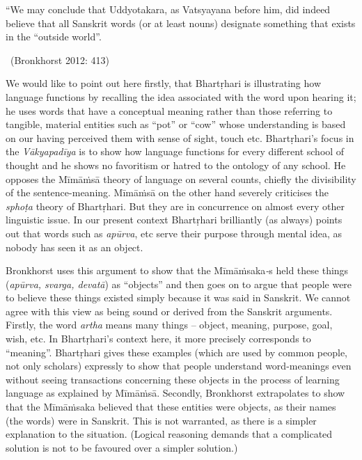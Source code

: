 \begin{myquote}
“We may conclude that Uddyotakara, as Vatsyayana before him, did indeed believe that all Sanskrit words (or at least nouns) designate something that exists in the “outside world”. 
\end{myquote}

\vspace{-.2cm}

\begin{myquote}

~\hfill (Bronkhorst 2012: 413)
\end{myquote}

We would like to point out here firstly, that Bhartṛhari is illustrating how language functions by recalling the idea associated with the word upon hearing it; he uses words that have a conceptual meaning rather than those referring to tangible, material entities such as “pot” or “cow” whose understanding is based on our having perceived them with sense of sight, touch etc. Bhartṛhari’s focus in the \textit{Vākyapadīya} is to show how language functions for every different school of thought and he shows no favoritism or hatred to the ontology of any school. He opposes the Mīmāṁsā theory of language on several counts, chiefly the divisibility of the sentence-meaning. Mīmāṁsā on the other hand severely criticises the \textit{sphoṭa} theory of Bhartṛhari. But they are in concurrence on almost every other linguistic issue. In our present context Bhartṛhari brilliantly (as always) points out that words such as \textit{apūrva}, etc serve their purpose through mental idea, as nobody has seen it as an object.

Bronkhorst uses this argument to show that the Mīmāṁsaka\textit{-}s held these things (\textit{apūrva, svarga, devatā}) as “objects” and then goes on to argue that people were to believe these things existed simply because it was said in Sanskrit. We cannot agree with this view as being sound or derived from the Sanskrit arguments. Firstly, the word \textit{artha} means many things -- object, meaning, purpose, goal, wish, etc. In Bhartṛhari’s context here, it more precisely corresponds to “meaning”. Bhartṛhari gives these examples (which are used by common people, not only scholars) expressly to show that people understand word-meanings even without seeing transactions concerning these objects in the process of learning language as explained by Mīmāṁsā. Secondly, Bronkhorst extrapolates to show that the Mīmāṁsaka believed that these entities were objects, as their names (the words) were in Sanskrit. This is not warranted, as there is a simpler explanation to the situation. (Logical reasoning demands that a complicated solution is not to be favoured over a simpler solution.)


